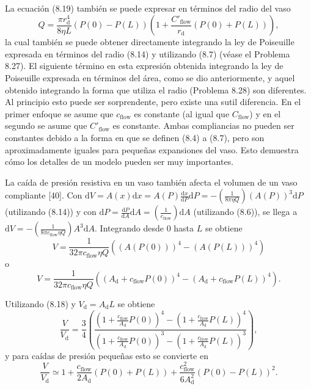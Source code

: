 \documentclass[12pt]{book}
\begin{document}
La ecuación (8.19) también se puede expresar en términos del radio del vaso
\begin{equation}
Q = \frac{\pi r_{\text{d}}^4}{8\eta L} (P(0) - P(L))\left( 1 + \frac{C'_{\text{flow}}}{r_{\text{d}}} (P(0) + P(L)) \right),
\label{eq:820}
\end{equation}
la cual también se puede obtener directamente integrando la ley de Poiseuille expresada en términos del radio (8.14) y utilizando (8.7) (véase el Problema 8.27). El siguiente término en esta expresión obtenida integrando la ley de Poiseuille expresada en términos del área, como se dio anteriormente, y aquel obtenido integrando la forma que utiliza el radio (Problema 8.28) son diferentes. Al principio esto puede ser sorprendente, pero existe una sutil diferencia. En el primer enfoque se asume que $c_{\text{flow}}$ es constante (al igual que $C_{\text{flow}}$) y en el segundo se asume que $C'_{\text{flow}}$ es constante. Ambas compliancias no pueden ser constantes debido a la forma en que se definen (8.4) a (8.7), pero son aproximadamente iguales para pequeñas expansiones del vaso. Esto demuestra cómo los detalles de un modelo pueden ser muy importantes.

La caída de presión resistiva en un vaso también afecta el volumen de un vaso compliante [40]. Con $\mathrm{d}V = A(x)\mathrm{d}x = A(P)\frac{\mathrm{d}x}{\mathrm{d}P}\mathrm{d}P = -\left(\frac{1}{8\pi\eta Q}\right) (A(P))^3 \mathrm{d}P$ (utilizando (8.14)) y con $\mathrm{d}P = \frac{\mathrm{d}P}{\mathrm{d}A}\mathrm{d}A = \left(\frac{1}{c_{\text{flow}}}\right) \mathrm{d}A$ (utilizando (8.6)), se llega a $\mathrm{d}V = -\left(\frac{1}{8\pi c_{\text{flow}} \eta Q}\right) A^3 \mathrm{d}A$. Integrando desde $0$ hasta $L$ se obtiene
\begin{equation}
V = \frac{1}{32\pi c_{\text{flow}} \eta Q} \left( (A(P(0)))^4 - (A(P(L)))^4 \right)
\label{eq:821}
\end{equation}
o
\begin{equation}
V = \frac{1}{32\pi c_{\text{flow}} \eta Q} \left( (A_{\text{d}} + c_{\text{flow}} P(0))^4 - (A_{\text{d}} + c_{\text{flow}} P(L))^4 \right).
\label{eq:822}
\end{equation}

Utilizando (8.18) y $V_{\text{d}} = A_{\text{d}} L$ se obtiene
\begin{equation}
\frac{V}{V_{\text{d}}} = \frac{3}{4} \left( \frac{\left(1 + \frac{c_{\text{flow}}}{A_{\text{d}}} P(0)\right)^4 - \left(1 + \frac{c_{\text{flow}}}{A_{\text{d}}} P(L)\right)^4}{\left(1 + \frac{c_{\text{flow}}}{A_{\text{d}}} P(0)\right)^3 - \left(1 + \frac{c_{\text{flow}}}{A_{\text{d}}} P(L)\right)^3} \right),
\label{eq:823}
\end{equation}
y para caídas de presión pequeñas esto se convierte en
\begin{equation}
\frac{V}{V_{\text{d}}} \simeq 1 + \frac{c_{\text{flow}}}{2 A_{\text{d}}} (P(0) + P(L)) + \frac{c_{\text{flow}}^2}{6 A_{\text{d}}^2} (P(0) - P(L))^2.
\label{eq:824}
\end{equation}
\end{document}
